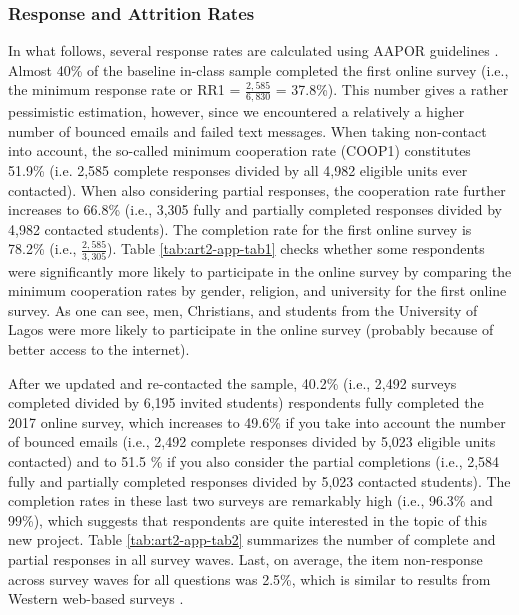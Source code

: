 \subsubsection{Response and Attrition Rates}
In what follows, several response rates are calculated using AAPOR guidelines \citep{AAPOR2016}. Almost 40\% of the baseline in-class sample completed the first online survey (i.e., the minimum response rate or RR1 = $\frac{2,585}{6,830}$ = 37.8\%). This number gives a rather pessimistic estimation, however, since we encountered a relatively a higher number of bounced emails and failed text messages. When taking non-contact into account, the so-called minimum cooperation rate (COOP1) constitutes 51.9\% (i.e. 2,585 complete responses divided by all 4,982 eligible units ever contacted). When also considering partial responses, the cooperation rate further increases to 66.8\% (i.e., 3,305 fully and partially completed responses divided by 4,982 contacted students). The completion rate for the first online survey is 78.2\% (i.e., $\frac{2,585}{3,305}$). Table \ref{tab:art2-app-tab1} checks whether some respondents were significantly more likely to participate in the online survey by comparing the minimum cooperation rates by gender, religion, and university for the first online survey. As one can see, men, Christians, and students from the University of Lagos were more likely to participate in the online survey (probably because of better access to the internet). 


After we updated and re-contacted the sample, 40.2\% (i.e., 2,492 surveys completed divided by 6,195 invited students) respondents fully completed the 2017 online survey, which increases to 49.6\% if you take into account the number of bounced emails (i.e., 2,492 complete responses divided by 5,023 eligible units contacted) and to 51.5 \% if you also consider the partial completions (i.e., 2,584 fully and partially completed responses divided by 5,023 contacted students). The completion rates in these last two surveys are remarkably high (i.e., 96.3\% and 99\%), which suggests that respondents are quite interested in the topic of this new project. Table \ref{tab:art2-app-tab2} summarizes the number of complete and partial responses in all survey waves. Last, on average, the item non-response across survey waves for all questions was 2.5\%, which is similar to results from Western web-based surveys \citep{Lesser2012, Millar2012}.



